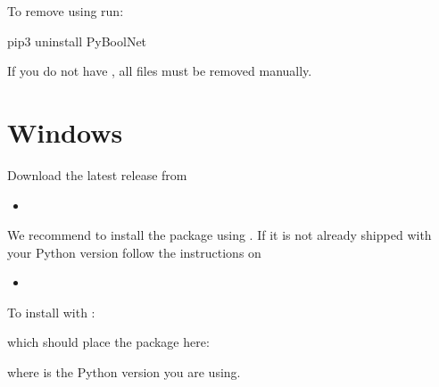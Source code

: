 \documentclass[letterpaper,10pt,english]{sphinxmanual}
\begin{document}
To remove  using  run:

\begin{sphinxVerbatim}[commandchars=\\\{\}]
\PYGZdl{} pip3 uninstall PyBoolNet
\end{sphinxVerbatim}

If you do not have , all files must be removed manually.


\section{Windows}
\label{\detokenize{Installation:windows}}
Download the latest release from
\begin{itemize}
\item {} 

\end{itemize}

We recommend to install the package using . If it is not already shipped with your Python version follow the instructions
on
\begin{itemize}
\item {} 

\end{itemize}

To install  with :

\begin{sphinxVerbatim}[commandchars=\\\{\}]
\PYGZbs{}   
\end{sphinxVerbatim}

which should place the package here:

\begin{sphinxVerbatim}[commandchars=\\\{\}]
\PYGZbs{}\PYGZbs{}\PYGZbs{}
\end{sphinxVerbatim}

where  is the Python version you are using.
\end{document}
